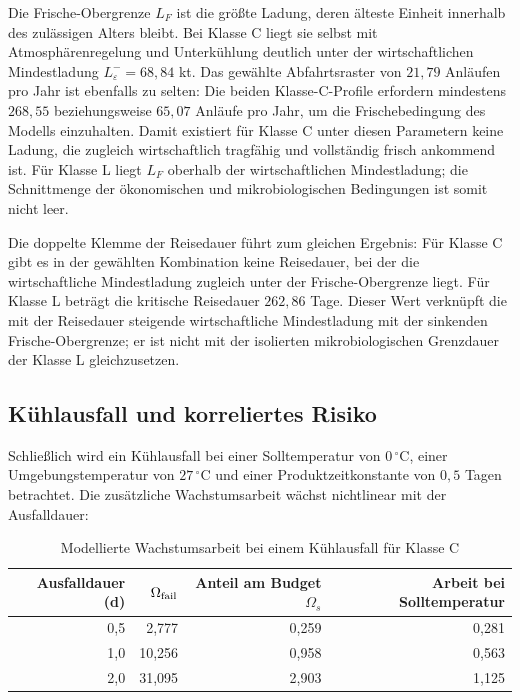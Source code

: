 \documentclass[a4paper, 12pt, twoside, openright]{report}
\theoremstyle{definition}
\theoremstyle{definition}
\begin{document}
Die Frische-Obergrenze $L_F$ ist die größte Ladung, deren älteste Einheit
innerhalb des zulässigen Alters bleibt. Bei Klasse C liegt sie selbst mit
Atmosphärenregelung und Unterkühlung deutlich unter der wirtschaftlichen
Mindestladung $L^-_\varepsilon=68{,}84$ kt. Das gewählte Abfahrtsraster von
$21{,}79$ Anläufen pro Jahr ist ebenfalls zu selten: Die beiden
Klasse-C-Profile erfordern mindestens $268{,}55$ beziehungsweise $65{,}07$
Anläufe pro Jahr, um die Frischebedingung des Modells einzuhalten. Damit
existiert für Klasse C unter diesen Parametern keine Ladung, die zugleich
wirtschaftlich tragfähig und vollständig frisch ankommend ist. Für Klasse L
liegt $L_F$ oberhalb der wirtschaftlichen Mindestladung; die Schnittmenge
der ökonomischen und mikrobiologischen Bedingungen ist somit nicht leer.

Die doppelte Klemme der Reisedauer führt zum gleichen Ergebnis: Für Klasse C
gibt es in der gewählten Kombination keine Reisedauer, bei der die
wirtschaftliche Mindestladung zugleich unter der Frische-Obergrenze liegt.
Für Klasse L beträgt die kritische Reisedauer $262{,}86$ Tage. Dieser Wert
verknüpft die mit der Reisedauer steigende wirtschaftliche Mindestladung mit
der sinkenden Frische-Obergrenze; er ist nicht mit der isolierten
mikrobiologischen Grenzdauer der Klasse L gleichzusetzen.

\subsection{Kühlausfall und korreliertes Risiko}

Schließlich wird ein Kühlausfall bei einer Solltemperatur von $0\,{}^\circ$C,
einer Umgebungstemperatur von $27\,{}^\circ$C und einer Produktzeitkonstante
von $0{,}5$ Tagen betrachtet. Die zusätzliche Wachstumsarbeit wächst
nichtlinear mit der Ausfalldauer:

\begin{table}[htbp]
  \centering
  \caption{Modellierte Wachstumsarbeit bei einem Kühlausfall für Klasse C}
  \label{tab:experiment-seefracht-ausfall}
  \begin{tabular}{rrrr}
    \toprule
    Ausfalldauer (d) & $\Omega_{\rm fail}$ &
      Anteil am Budget $\Omega_s$ & Arbeit bei Solltemperatur \\
    \midrule
    0{,}5 & 2{,}777 & 0{,}259 & 0{,}281 \\
    1{,}0 & 10{,}256 & 0{,}958 & 0{,}563 \\
    2{,}0 & 31{,}095 & 2{,}903 & 1{,}125 \\
    \bottomrule
  \end{tabular}
\end{table}
\end{document}
